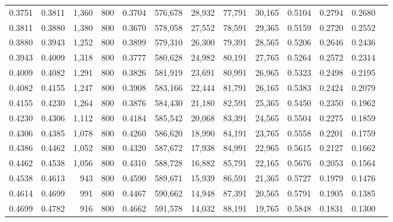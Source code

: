 \begin{tabular}{rrrrrrrrrrrrr}
0.3751 & 0.3811 &  1,360 &   800 &                                     0.3704 & 576,678 &  28,932 &  77,791 &  30,165 & 0.5104 & 0.2794 & 0.2680 \\
0.3811 & 0.3880 &  1,380 &   800 &                                     0.3670 & 578,058 &  27,552 &  78,591 &  29,365 & 0.5159 & 0.2720 & 0.2552 \\
0.3880 & 0.3943 &  1,252 &   800 &                                     0.3899 & 579,310 &  26,300 &  79,391 &  28,565 & 0.5206 & 0.2646 & 0.2436 \\
0.3943 & 0.4009 &  1,318 &   800 &                                     0.3777 & 580,628 &  24,982 &  80,191 &  27,765 & 0.5264 & 0.2572 & 0.2314 \\
0.4009 & 0.4082 &  1,291 &   800 &                                     0.3826 & 581,919 &  23,691 &  80,991 &  26,965 & 0.5323 & 0.2498 & 0.2195 \\
0.4082 & 0.4155 &  1,247 &   800 &                                     0.3908 & 583,166 &  22,444 &  81,791 &  26,165 & 0.5383 & 0.2424 & 0.2079 \\
0.4155 & 0.4230 &  1,264 &   800 &                                     0.3876 & 584,430 &  21,180 &  82,591 &  25,365 & 0.5450 & 0.2350 & 0.1962 \\
0.4230 & 0.4306 &  1,112 &   800 &                                     0.4184 & 585,542 &  20,068 &  83,391 &  24,565 & 0.5504 & 0.2275 & 0.1859 \\
0.4306 & 0.4385 &  1,078 &   800 &                                     0.4260 & 586,620 &  18,990 &  84,191 &  23,765 & 0.5558 & 0.2201 & 0.1759 \\
0.4386 & 0.4462 &  1,052 &   800 &                                     0.4320 & 587,672 &  17,938 &  84,991 &  22,965 & 0.5615 & 0.2127 & 0.1662 \\
0.4462 & 0.4538 &  1,056 &   800 &                                     0.4310 & 588,728 &  16,882 &  85,791 &  22,165 & 0.5676 & 0.2053 & 0.1564 \\
0.4538 & 0.4613 &    943 &   800 &                                     0.4590 & 589,671 &  15,939 &  86,591 &  21,365 & 0.5727 & 0.1979 & 0.1476 \\
0.4614 & 0.4699 &    991 &   800 &                                     0.4467 & 590,662 &  14,948 &  87,391 &  20,565 & 0.5791 & 0.1905 & 0.1385 \\
0.4699 & 0.4782 &    916 &   800 &                                     0.4662 & 591,578 &  14,032 &  88,191 &  19,765 & 0.5848 & 0.1831 & 0.1300 \\

\end{tabular}

